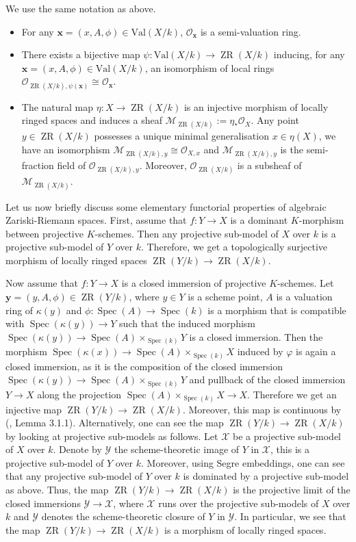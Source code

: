 \documentclass [11pt,reqno]{amsart}
\newcommand{\1}{\mathmybb{1}}
\def\cM{{\mathcal{M}}}
\def\cO{{\mathcal{O}}}
\def\cX{{\mathcal{X}}}
\def\cY{{\mathcal{Y}}}
\def\Spec{\operatorname{Spec}}
\def\ZR{\operatorname{ZR}}
\begin{document}
\begin{theorem}
\label{th:ZR_Temkin}
We use the same notation as above. 
\begin{itemize}
	\item[(1)] For any $\mathbf{x}=(x,A,\phi)\in\mathrm{Val}(X/k)$, $\cO_{\mathbf{x}}$ is a semi-valuation ring.
	\item[(2)] There exists a bijective map $\psi: \mathrm{Val}(X/k) \to \ZR(X/k)$ inducing, for any $\mathbf{x}=(x,A,\phi)\in\mathrm{Val}(X/k)$, an isomorphism of local rings $\cO_{\ZR(X/k),\psi(\mathbf{x})} \cong \cO_{\mathbf{x}}$.
	\item[(3)] The natural map $\eta : X \to \ZR(X/k)$ is an injective morphism of locally ringed spaces and induces a sheaf $\cM_{\ZR(X/k)} :=  \eta_{\ast}\cO_{X}$. Any point $y\in \ZR(X/k)$ possesses a unique minimal generalisation $x\in \eta(X)$, we have an isomorphism $\cM_{\ZR(X/k),y}\cong \cO_{X,x}$ and $\cM_{\ZR(X/k),y}$ is the semi-fraction field of $\cO_{\ZR(X/k),y}$. Moreover, $\cO_{\ZR(X/k)}$ is a subsheaf of  $\cM_{\ZR(X/k)}$. 
\end{itemize}
\end{theorem}

Let us now briefly discuss some elementary functorial properties of algebraic Zariski-Riemann spaces. First, assume that $f:Y\to X$ is a dominant $K$-morphism between projective $K$-schemes. Then any projective sub-model of $X$ over $k$ is a projective sub-model of $Y$ over $k$. Therefore, we get a topologically surjective morphism of locally ringed spaces $\ZR(Y/k)\to \ZR(X/k)$. 

Now assume that $f:Y \to X$ is a closed immersion of projective $K$-schemes. Let $\mathbf{y}=(y,A,\phi)\in \ZR(Y/k)$, where $y\in Y$ is a scheme point, $A$ is a valuation ring of $\kappa(y)$ and $\phi : \Spec(A) \to \Spec(k)$ is a morphism that is compatible with $\Spec(\kappa(y))\to Y$ such that the induced morphism $\Spec(\kappa(y)) \to \Spec(A) \times_{\Spec(k)} Y$ is a closed immersion. Then the morphism $\Spec(\kappa(x)) \to \Spec(A) \times_{\Spec(k)} X$ induced by $\varphi$ is again a closed immersion, as it is the composition of the closed immersion $\Spec(\kappa(y)) \to \Spec(A) \times_{\Spec(k)} Y$ and pullback of the closed immersion $Y\to X$ along the projection $\Spec(A) \times_{\Spec(k)} X \to X$. Therefore we get an injective map $\ZR(Y/k)\to \ZR(X/k)$. Moreover, this map is continuous by (\cite{Temkin11}, Lemma 3.1.1). Alternatively, one can see the map $\ZR(Y/k)\to\ZR(X/k)$ by looking at projective sub-models as follows. Let $\cX$ be a projective sub-model of $X$ over $k$. Denote by $\cY$ the scheme-theoretic image of $Y$ in $\cX$, this is a projective sub-model of $Y$ over $k$. Moreover, using Segre embeddings, one can see that any projective sub-model of $Y$ over $k$ is dominated by a projective sub-model as above. Thus, the map $\ZR(Y/k)\to\ZR(X/k)$ is the projective limit of the closed immersions $\cY\to\cX$, where $\cX$ runs over the projective sub-models of $X$ over $k$ and $\cY$ denotes the scheme-theoretic closure of $Y$ in $\cY$. In particular, we see that the map $\ZR(Y/k)\to\ZR(X/k)$ is a morphism of locally ringed spaces. 
\end{document}
